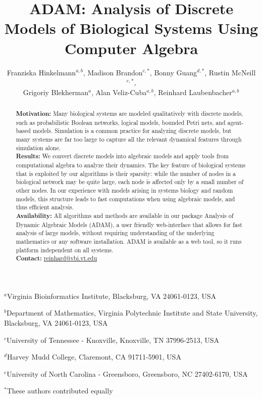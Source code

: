 \documentclass[11pt]{amsart}
\title{ADAM: Analysis of Discrete Models of Biological
Systems Using Computer Algebra}
\author{Franziska Hinkelmann$^{a,b}$,
Madison Brandon$^{c,*}$,
Bonny Guang$^{d,*}$,
Rustin McNeill$^{e,*}$, \\
Grigoriy Blekherman$^{a}$,
Alan Veliz-Cuba$^{a,b}$,
Reinhard Laubenbacher$^{a,b}$}
\begin{document}
\maketitle
{\footnotesize
            \centerline{$^a$Virginia Bioinformatics Institute, Blacksburg, VA 24061-0123, USA}
}
{\footnotesize
            \centerline{$^b$Department of Mathematics,
             Virginia Polytechnic Institute and State University, Blacksburg, VA 24061-0123, USA}
}
{\footnotesize
            \centerline{$^c$University of Tennessee - Knoxville, Knoxville, TN 37996-2513, USA}
}
{\footnotesize
            \centerline{$^d$Harvey Mudd College, Claremont, CA 91711-5901, USA}
}
{\footnotesize
            \centerline{$^e$University of North Carolina - Greensboro, Greensboro, NC 27402-6170, USA}
}
{\footnotesize
            \centerline{$^*$These authors contributed equally}
}
\begin{abstract}
{\bf Motivation:} Many biological systems are modeled qualitatively with discrete models, such as
probabilistic Boolean networks, logical models, bounded Petri nets, and agent-based models.
Simulation is a common practice for analyzing discrete models, but many systems are far too large
to capture all the relevant dynamical features through simulation alone. \\
{\bf Results:} We convert discrete models into algebraic models
and apply tools from computational algebra to analyze their dynamics.
The key feature of biological systems that is exploited by our algorithms is their sparsity: while the number of nodes in a
biological network may be quite large, each node is affected only by a small number of other nodes. In our experience with models arising in systems biology and random models, this structure leads to fast
computations when using algebraic models, and thus efficient analysis.\\
{\bf Availability:} All algorithms and methods are available in our package Analysis of Dynamic
Algebraic Models (ADAM), a user friendly web-interface
that allows for fast analysis of large models, without requiring understanding of the underlying mathematics or any software installation. ADAM is available as a web tool, so it runs platform independent on all systems.\\
{\bf Contact:} \href{mailto:reinhard@vbi.vt.edu}{reinhard@vbi.vt.edu}\\
\end{abstract}
\end{document}

